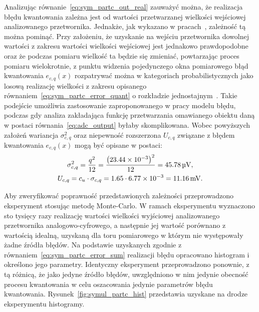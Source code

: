 Analizując równanie~\eqref{eq:sym_partc_out_real} zauważyć można, że realizacja błędu kwantowania zależna jest od wartości przetwarzanej wielkości wejściowej analizowanego przetwornika. Jednakże, jak wykazano w pracach~\cite{sienkowski_kwant, sienkowski_adc}, zależność tą można pominąć. Przy założeniu, że uzyskanie na wejściu przetwornika dowolnej wartości z zakresu wartości wielkości wejściowej jest jednakowo prawdopodobne oraz że podczas pomiaru wielkość ta będzie się zmieniać, powtarzając proces pomiaru wielokrotnie, z punktu widzenia pojedynczego okna pomiarowego błąd kwantowania $e_{c,q}(x)$ rozpatrywać można w kategoriach probabilistycznych jako losową realizację wielkości z zakresu opisanego równaniem~\eqref{eq:sym_partc_error_quant} o rozkładzie jednostajnym~\cite{jakubiec_system}. Takie podejście umożliwia zastosowanie zaproponowanego w pracy modelu błędu, podczas gdy analiza zakładająca funkcję przetwarzania omawianego obiektu daną w postaci równania~\eqref{eq:adc_output} byłaby skomplikowana. Wobec powyższych założeń wariancja $\sigma_{c,q}^{2}$ oraz niepewność rozszerzona $U_{c,q}$ związane z błędem kwantowania $e_{c,q}(x)$ mogą być opisane w postaci:
\begin{gather}
\sigma_{c,q}^{2} = \frac{ q^{2}}{12} = \frac{\left(\num{23.44e-3}\right)^{2} }{12} = \qty{45.78}{\micro V} \label{eq:sym_partc_var_quant}, \\
U_{c,q} = c_{u} \cdot \sigma_{c,q} = 1.65 \cdot \num{6.77e-3} = \qty{11.16}{mV} \label{eq:sym_partc_uncert_quant}.
\end{gather}

Aby zweryfikować poprawność przedstawionych zależności przeprowadzono eksperyment stosując metodę Monte-Carlo. W ramach eksperymentu wyznaczono sto tysięcy razy realizację wartości wielkości wyjściowej analizowanego przetwornika analogowo-cyfrowego, a następnie jej wartość porównano z wartością idealną, uzyskaną dla toru pomiarowego w którym nie występowały żadne źródła błędów. Na podstawie uzyskanych zgodnie z równaniem~\eqref{eq:sym_partc_error_sum} realizacji błędu opracowano histogram i określono jego parametry. Identyczny eksperyment przeprowadzono ponownie, z tą różnicą, że jako jedyne źródło błędów, uwzględniono w nim jedynie obecność procesu kwantowania w celu oszacowania jedynie parametrów błędu kwantowania. Rysunek~\ref{fig:symul_partc_hist} przedstawia uzyskane na drodze eksperymentu histogramy.

